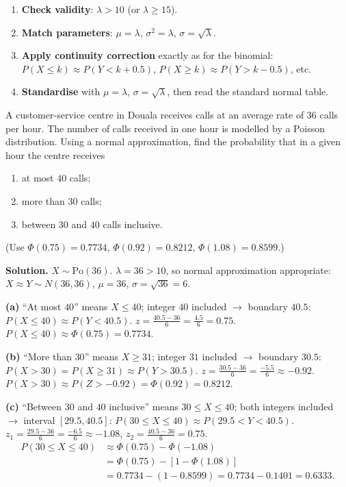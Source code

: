 \documentclass[11pt]{article}
\begin{document}
\begin{methode}
\begin{enumerate}
\item \textbf{Check validity}: $\lambda > 10$ (or $\lambda \geq 15$).
\item \textbf{Match parameters}: $\mu = \lambda$, $\sigma^{2} = \lambda$, $\sigma = \sqrt{\lambda}$.
\item \textbf{Apply continuity correction} exactly as for the binomial:
$P(X \leq k) \approx P(Y < k+0.5)$, $P(X \geq k) \approx P(Y > k-0.5)$, etc.
\item \textbf{Standardise} with $\mu = \lambda$, $\sigma = \sqrt{\lambda}$, then read the standard normal table.
\end{enumerate}
\end{methode}

\begin{exemplebox}
A customer-service centre in Douala receives calls at an average rate of $36$ calls per hour. The number of calls received in one hour is modelled by a Poisson distribution. Using a normal approximation, find the probability that in a given hour the centre receives
\begin{enumerate}
\item[(a)] at most $40$ calls;
\item[(b)] more than $30$ calls;
\item[(c)] between $30$ and $40$ calls inclusive.
\end{enumerate}
(Use $\Phi(0.75) = 0.7734$, $\Phi(0.92) = 0.8212$, $\Phi(1.08) = 0.8599$.)
\end{exemplebox}

\begin{exoresolu}
\textbf{Solution.} $X \sim \mathrm{Po}(36)$. $\lambda = 36 > 10$, so normal approximation appropriate:
$X \approx Y \sim N(36, 36)$, $\mu = 36$, $\sigma = \sqrt{36} = 6$.

\textbf{(a)} ``At most $40$'' means $X \leq 40$; integer $40$ included $\rightarrow$ boundary $40.5$:
$P(X \leq 40) \approx P(Y < 40.5)$.
$z = \frac{40.5 - 36}{6} = \frac{4.5}{6} = 0.75$.
$P(X \leq 40) \approx \Phi(0.75) = 0.7734$.

\textbf{(b)} ``More than $30$'' means $X \geq 31$; integer $31$ included $\rightarrow$ boundary $30.5$:
$P(X > 30) = P(X \geq 31) \approx P(Y > 30.5)$.
$z = \frac{30.5 - 36}{6} = \frac{-5.5}{6} \approx -0.92$.
$P(X > 30) \approx P(Z > -0.92) = \Phi(0.92) = 0.8212$.

\textbf{(c)} ``Between $30$ and $40$ inclusive'' means $30 \leq X \leq 40$; both integers included $\rightarrow$ interval $[29.5, 40.5]$:
$P(30 \leq X \leq 40) \approx P(29.5 < Y < 40.5)$.
$z_1 = \frac{29.5 - 36}{6} = \frac{-6.5}{6} \approx -1.08$, $z_2 = \frac{40.5 - 36}{6} = 0.75$.
\begin{align*}
P(30 \leq X \leq 40) &\approx \Phi(0.75) - \Phi(-1.08) \\
&= \Phi(0.75) - [1 - \Phi(1.08)] \\
&= 0.7734 - (1 - 0.8599) = 0.7734 - 0.1401 = 0.6333.
\end{align*}
\end{exoresolu}
\end{document}
